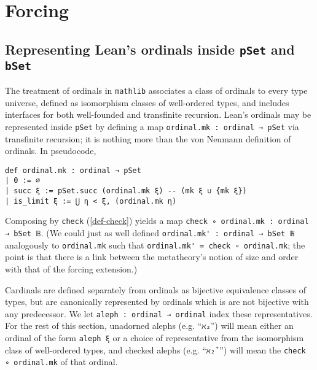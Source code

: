 \documentclass[a4paper,USenglish,cleveref, autoref]{lipics-v2019}
\newcommand{\B}{\mathbb{B}}
\newcommand{\lil}{\lstinline}
\theoremstyle{definition}
\begin{document}
\section{Forcing}
\label{sect:forcing}

\subsection{Representing Lean's ordinals inside \lil{pSet} and \lil{bSet}}
The treatment of ordinals in \lil{mathlib} associates a class of ordinals to every type universe, defined as isomorphism classes of well-ordered types, and includes interfaces for both well-founded and transfinite recursion. Lean's ordinals may be represented inside \lil{pSet} by defining a map \lil{ordinal.mk : ordinal → pSet} via transfinite recursion; it is nothing more than the von Neumann definition of ordinals. In pseudocode,
\begin{lstlisting}
def ordinal.mk : ordinal → pSet
| 0 := ∅
| succ ξ := pSet.succ (ordinal.mk ξ) -- (mk ξ ∪ {mk ξ})
| is_limit ξ := ⋃ η < ξ, (ordinal.mk η)
\end{lstlisting}
Composing by \lil{check} (\autoref{def-check}) yields a map \lil{check ∘ ordinal.mk : ordinal → bSet 𝔹}. (We could just as well defined \lstinline{ordinal.mk' : ordinal → bSet 𝔹} analogously to \lstinline{ordinal.mk} such that \lstinline{ordinal.mk' = check ∘ ordinal.mk}; the point is that there is a link between the metatheory's notion of size and order with that of the forcing extension.)

Cardinals are defined separately from ordinals as bijective equivalence classes of types, but are canonically represented by ordinals which is are not bijective with any predecessor. We let \lil{aleph : ordinal → ordinal} index these representatives. For the rest of this section, unadorned alephs (e.g. ``\lil{ℵ₂}'') will mean either an ordinal of the form \lil{aleph ξ} or a choice of representative from the isomorphism class of well-ordered types, and checked alephs (e.g. ``\lil{ℵ₂̌ }'') will mean the \lil{check ∘ ordinal.mk} of that ordinal.
\end{document}
